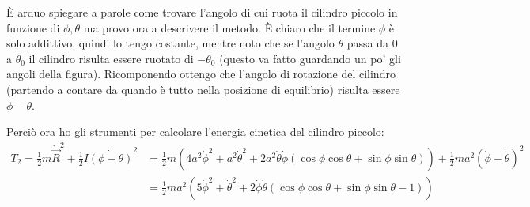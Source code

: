 \documentclass[../main.tex]{subfiles}
\begin{document}
È arduo spiegare a parole come trovare l'angolo di cui ruota il cilindro piccolo in funzione di $\phi,\theta$ ma provo ora a descrivere il metodo.
È chiaro che il termine $\phi$ è solo addittivo, quindi lo tengo costante, mentre noto che se l'angolo $\theta$ passa da $0$ a $\theta_0$ il cilindro risulta essere ruotato di $-\theta_0$ (questo va fatto guardando un po' gli angoli della figura).
Ricomponendo ottengo che l'angolo di rotazione del cilindro (partendo a contare da quando è tutto nella posizione di equilibrio) risulta essere $\phi-\theta$.

Perciò ora ho gli strumenti per calcolare l'energia cinetica del cilindro piccolo:
\begin{equation}\begin{split}
	T_2=\frac 12 m {\dot{\vec R}}^2+\frac 12 I \dot{(\phi-\theta)}^2&=
	\frac12m\left(4a^2{\dot\phi}^2+a^2{\dot\theta}^2+2a^2\dot\theta\dot\phi(\cos\phi\cos\theta+\sin\phi\sin\theta)\right)
	+\frac12ma^2\left(\dot\phi-\dot\theta\right)^2 \\
	&= \frac 12ma^2\left(5{\dot\phi}^2+{\dot\theta}^2+2\dot\phi\dot\theta(\cos\phi\cos\theta+\sin\phi\sin\theta-1)\right)
\end{split}\end{equation}
\end{document}
